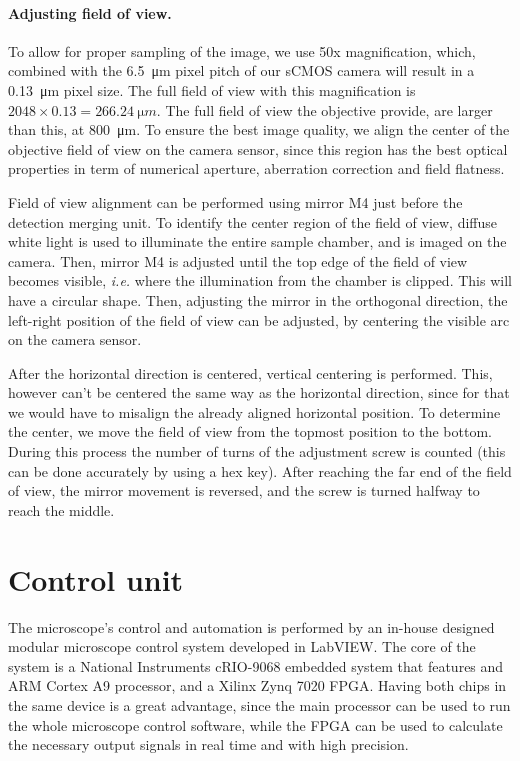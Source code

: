     \paragraph{Adjusting field of view.}
      To allow for proper sampling of the image, we use 50x magnification, which, combined with the \SI{6.5}{\micro m} pixel pitch of our sCMOS camera will result in a \SI{0.13}{\micro m} pixel size. The full field of view with this magnification is $2048 \times 0.13 = \SI{266.24}{\micro m}$. The full field of view the objective provide, are larger than this, at \SI{800}{\micro m}. To ensure the best image quality, we align the center of the objective field of view on the camera sensor, since this region has the best optical properties in term of numerical aperture, aberration correction and field flatness.

      Field of view alignment can be performed using mirror M4 just before the detection merging unit. To identify the center region of the field of view, diffuse white light is used to illuminate the entire sample chamber, and is imaged on the camera. Then, mirror M4 is adjusted until the top edge of the field of view becomes visible, \textit{i.e.} where the illumination from the chamber is clipped. This will have a circular shape. Then, adjusting the mirror in the orthogonal direction, the left-right position of the field of view can be adjusted, by centering the visible arc on the camera sensor.

      After the horizontal direction is centered, vertical centering is performed. This, however can't be centered the same way as the horizontal direction, since for that we would have to misalign the already aligned horizontal position. To determine the center, we move the field of view from the topmost position to the bottom. During this process the number of  turns of the adjustment screw is counted (this can be done accurately by using a hex key). After reaching the far end of the field of view, the mirror movement is reversed, and the screw is turned halfway to reach the middle.







\section{Control unit}

  The microscope's control and automation is performed by an in-house designed modular microscope control system \cite{balazs_development_2013} developed in LabVIEW. The core of the system is a National Instruments cRIO-9068 embedded system that features and ARM Cortex A9 processor, and a Xilinx Zynq 7020 FPGA.
  Having both chips in the same device is a great advantage, since the main processor can be used to run the whole microscope control software, while the FPGA can be used to calculate the necessary output signals in real time and with high precision.
  
